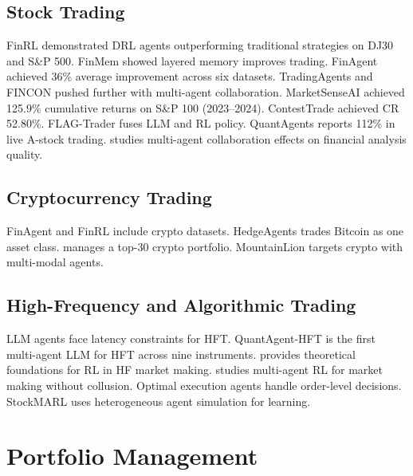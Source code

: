 \documentclass[12pt]{report}
\begin{document}
\subsection{Stock Trading}

FinRL \citep{liu2020finrl,liu2021finrl} demonstrated DRL agents outperforming traditional strategies on DJ30 and S\&P 500. FinMem \citep{yu2023finmem} showed layered memory improves trading. FinAgent \citep{zhang2024finagent} achieved 36\% average improvement across six datasets. TradingAgents \citep{xiao2024tradingagents} and FINCON \citep{yu2024fincon} pushed further with multi-agent collaboration. MarketSenseAI \citep{fatouros2025marketsenseai} achieved 125.9\% cumulative returns on S\&P 100 (2023--2024). ContestTrade \citep{zhao2025contesttrade} achieved CR 52.80\%. FLAG-Trader \citep{xiong2025flagtrader} fuses LLM and RL policy. QuantAgents \citep{li2025quantagents} reports 112\% in live A-stock trading. \citet{collaboration2024investment} studies multi-agent collaboration effects on financial analysis quality.

\subsection{Cryptocurrency Trading}

FinAgent \citep{zhang2024finagent} and FinRL \citep{liu2020finrl} include crypto datasets. HedgeAgents \citep{li2025hedgeagents} trades Bitcoin as one asset class. \citet{luo2025cryptoportfolio} manages a top-30 crypto portfolio. MountainLion \citep{wu2025mountainlion} targets crypto with multi-modal agents.

\subsection{High-Frequency and Algorithmic Trading}

LLM agents face latency constraints for HFT. QuantAgent-HFT \citep{xiong2025quantagenthft} is the first multi-agent LLM for HFT across nine instruments. \citet{zheng2024rlhfmm} provides theoretical foundations for RL in HF market making. \citet{wang2025marlmm} studies multi-agent RL for market making without collusion. Optimal execution agents \citep{hafsi2024optimalexecution,zakaria2025drlorder} handle order-level decisions. StockMARL \citep{zou2025stockmarl} uses heterogeneous agent simulation for learning.

\section{Portfolio Management}
\end{document}

